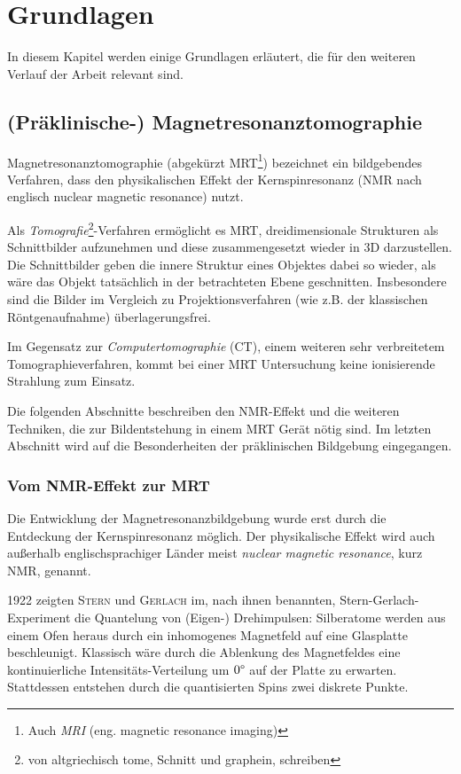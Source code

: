 \chapter{Grundlagen}
In diesem Kapitel werden einige Grundlagen erläutert, die für den weiteren Verlauf der Arbeit relevant sind.

\section{(Präklinische-) Magnetresonanztomographie}
Magnetresonanztomographie (abgekürzt MRT\footnote{Auch \textit{MRI} (eng. magnetic resonance imaging)}) bezeichnet ein bildgebendes Verfahren, dass den physikalischen Effekt der Kernspinresonanz (NMR nach englisch nuclear magnetic resonance) nutzt.

Als \textit{Tomografie}\footnote{von altgriechisch tome, Schnitt und graphein, schreiben}-Verfahren ermöglicht es MRT, dreidimensionale Strukturen als Schnittbilder aufzunehmen und diese zusammengesetzt wieder in 3D darzustellen. Die Schnittbilder geben die innere Struktur eines Objektes dabei so wieder, als wäre das Objekt tatsächlich in der betrachteten Ebene geschnitten. Insbesondere sind die Bilder im Vergleich zu Projektionsverfahren (wie z.B. der klassischen Röntgenaufnahme) überlagerungsfrei.

Im Gegensatz zur \textit{Computertomographie} (CT), einem weiteren sehr verbreitetem Tomographieverfahren, kommt bei einer MRT Untersuchung keine ionisierende Strahlung zum Einsatz.

Die folgenden Abschnitte beschreiben den NMR-Effekt und die weiteren Techniken, die zur Bildentstehung in einem MRT Gerät nötig sind. Im letzten Abschnitt wird auf die Besonderheiten der präklinischen Bildgebung eingegangen.

\subsection{Vom NMR-Effekt zur MRT}
Die Entwicklung der Magnetresonanzbildgebung wurde erst durch die Entdeckung der Kernspinresonanz möglich. Der physikalische Effekt wird auch außerhalb englischsprachiger Länder meist \textit{nuclear magnetic resonance}, kurz NMR, genannt.

1922 zeigten \textsc{Stern} und \textsc{Gerlach} im, nach ihnen benannten, Stern-Gerlach-Experiment die Quantelung von (Eigen-) Drehimpulsen: Silberatome werden aus einem Ofen heraus durch ein inhomogenes Magnetfeld auf eine Glasplatte beschleunigt. Klassisch wäre durch die Ablenkung des Magnetfeldes eine kontinuierliche Intensitäts-Verteilung um $0\degree$ auf der Platte zu erwarten. Stattdessen entstehen durch die quantisierten Spins zwei diskrete Punkte. \cite{Gerlach1922}

